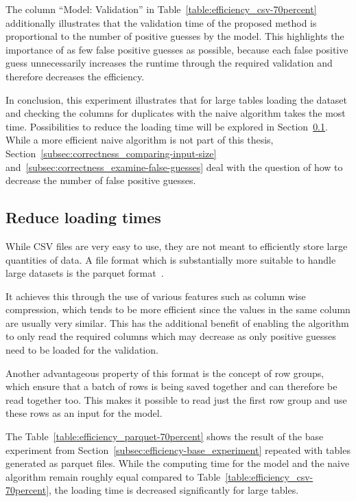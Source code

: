 The column \enquote{Model: Validation} in Table~\ref{table:efficiency_csv-70percent} additionally illustrates that the validation time of the proposed method is proportional to the number of positive guesses by the model. This highlights the importance of as few false positive guesses as possible, because each false positive guess unnecessarily increases the runtime through the required validation and therefore decreases the efficiency.

In conclusion, this experiment illustrates that for large tables loading the dataset and checking the columns for duplicates with the naive algorithm takes the most time. Possibilities to reduce the loading time will be explored in Section~\ref{subsec:efficiency-shorter_loading_times}. While a more efficient naive algorithm is not part of this thesis, Section~\ref{subsec:correctness_comparing-input-size} and~\ref{subsec:correctness_examine-false-guesses} deal with the question of how to decrease the number of false positive guesses.






\subsection{Reduce loading times}\label{subsec:efficiency-shorter_loading_times}
While CSV files are very easy to use, they are not meant to efficiently store large quantities of data. A file format which is substantially more suitable to handle large datasets is the parquet format~\cite{parquet-book}.

It achieves this through the use of various features such as column wise compression, which tends to be more efficient since the values in the same column are usually very similar. This has the additional benefit of enabling the algorithm to only read the required columns which may decrease \io{} as only positive guesses need to be loaded for the validation.

Another advantageous property of this format is the concept of row groups, which ensure that a batch of rows is being saved together and can therefore be read together too. This makes it possible to read just the first row group and use these rows as an input for the model.

The Table~\ref{table:efficiency_parquet-70percent} shows the result of the base experiment from Section~\ref{subsec:efficiency-base_experiment} repeated with tables generated as parquet files. While the computing time for the model and the naive algorithm remain roughly equal compared to Table~\ref{table:efficiency_csv-70percent}, the loading time is decreased significantly for large tables. %

